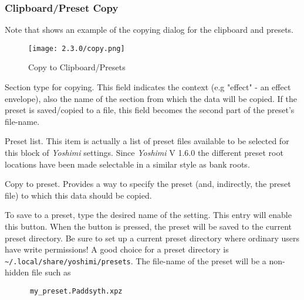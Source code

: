\subsubsection{Clipboard/Preset Copy}
\label{subsubsec:clipboard_copy}

   Note that \hspace {6 pt}shows an example of the copying
   dialog for the clipboard and presets.

\begin{figure}[H]
   \centering
   \texttt{[image: 2.3.0/copy.png]}
   \caption[Copy to Clipboard/Presets]{Copy to Clipboard/Presets}
   \label{fig:copy_to_clipboard/presets}
\end{figure}

   \setcounter{ItemCounter}{0}      %

   Section type for copying.
   This field indicates the context (e.g "effect" - an effect envelope), also the
   name of the section from which the data will be copied.
   If the preset is saved/copied to a file, this field becomes the second part of
   the preset's file-name.

   Preset list.
   This item is actually a list of preset files available to be selected for
   this block of \textsl{Yoshimi} settings. Since \textsl{Yoshimi} V 1.6.0 the
   different preset root locations have been made selectable in a similar style
   as bank roots.

   Copy to preset.
   Provides a way to specify the preset (and, indirectly, the preset file)
   to which this data should be copied.

   To save to a preset, type the desired name of the setting.  This entry
   will enable this button.  When the button is pressed, the preset will
   be saved to the current preset directory.
   Be sure to set up a current preset directory where ordinary users have
   write permissions!
   A good choice for a preset directory is
   \texttt{\textasciitilde/.local/share/yoshimi/presets}.
   The file-name of the preset will be a non-hidden file such as

   \begin{verbatim}
      my_preset.Paddsyth.xpz
   \end{verbatim}

